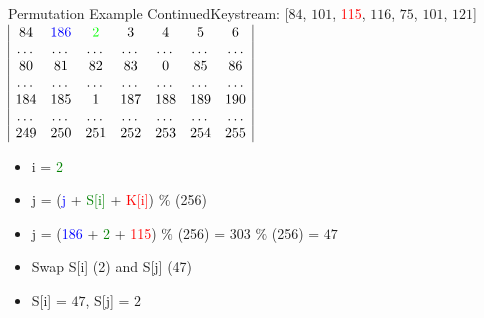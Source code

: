\documentclass[
	aspectratio=169,	%
	onlytextwidth,		%
	t					%
	]{beamer}
\begin{document}
\begin{frame}{Permutation Example Continued}{Keystream: [$84$, $101$, \textcolor{red} {115}, $116$, $75$, $101$, $121$]}
	$\begin{array}{|ccccccc|}
		84 & \textcolor{blue} {186} & \textcolor{green}{2} & 3 & 4 & 5 & 6 \\
		\dots & \dots & \dots & \dots & \dots & \dots & \dots \\
		80 & 81 & 82 & 83 & 0 & 85 & 86 \\
		\dots & \dots & \dots & \dots & \dots & \dots & \dots \\
		184 & 185 & 1 & 187 & 188 & 189 & 190\\
		\dots & \dots & \dots & \dots & \dots & \dots & \dots \\
		249 & 250 & 251 & 252 & 253 & 254 & 255 \\
	\end{array}$
	\begin{itemize}
		\item i = \textcolor{green}{2}
		\item j = (\textcolor{blue} {j} + \textcolor{green}{S[i]} + \textcolor{red}{K[i]}) $\%$ (256)
		\item j = (\textcolor{blue} {186} + \textcolor{green} {2} + \textcolor{red} {115}) $\%$ (256) = 303 $\%$ (256) = $47$
		\item Swap S[i] (2) and S[j] (47)
		\item S[i] = $47$, S[j] = $2$
	\end{itemize}
\end{frame}
\end{document}
